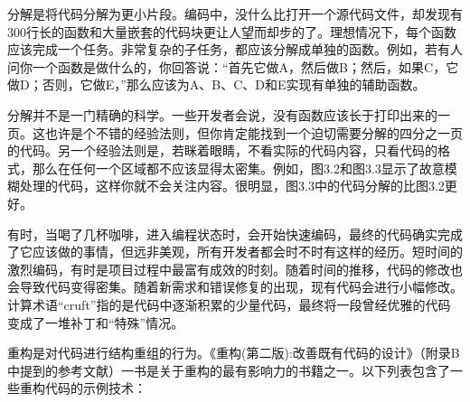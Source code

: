 
分解是将代码分解为更小片段。编码中，没什么比打开一个源代码文件，却发现有300行长的函数和大量嵌套的代码块更让人望而却步的了。理想情况下，每个函数应该完成一个任务。非常复杂的子任务，都应该分解成单独的函数。例如，若有人问你一个函数是做什么的，你回答说：“首先它做A，然后做B；然后，如果C，它做D；否则，它做E，”那么应该为A、B、C、D和E实现有单独的辅助函数。

分解并不是一门精确的科学。一些开发者会说，没有函数应该长于打印出来的一页。这也许是个不错的经验法则，但你肯定能找到一个迫切需要分解的四分之一页的代码。另一个经验法则是，若眯着眼睛，不看实际的代码内容，只看代码的格式，那么在任何一个区域都不应该显得太密集。例如，图3.2和图3.3显示了故意模糊处理的代码，这样你就不会关注内容。很明显，图3.3中的代码分解的比图3.2更好。




有时，当喝了几杯咖啡，进入编程状态时，会开始快速编码，最终的代码确实完成了它应该做的事情，但远非美观，所有开发者都会时不时有这样的经历。短时间的激烈编码，有时是项目过程中最富有成效的时刻。随着时间的推移，代码的修改也会导致代码变得密集。随着新需求和错误修复的出现，现有代码会进行小幅修改。计算术语“cruft”指的是代码中逐渐积累的少量代码，最终将一段曾经优雅的代码变成了一堆补丁和“特殊”情况。

重构是对代码进行结构重组的行为。《重构(第二版):改善既有代码的设计》（附录B中提到的参考文献）一书是关于重构的最有影响力的书籍之一。以下列表包含了一些重构代码的示例技术：

